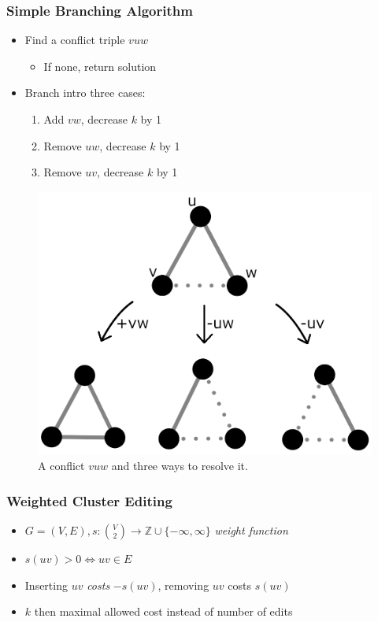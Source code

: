 \documentclass{beamer}
\begin{document}
\begin{frame}
	\frametitle{Simple Branching Algorithm}
	\begin{itemize}
		\item Find a conflict triple $vuw$
			\begin{itemize}
				\item If none, return solution
			\end{itemize}
		\item Branch intro three cases:
			\begin{enumerate}
				\item Add $vw$, decrease $k$ by 1
				\item Remove $uw$, decrease $k$ by 1
				\item Remove $uv$, decrease $k$ by 1
			\end{enumerate}
	\end{itemize}

	\begin{figure}[h]
		\centering
		\includegraphics[scale=0.5]{conflicts}
		\caption{A conflict $v u w$ and three ways to resolve it.}
	\end{figure}
\end{frame}

\begin{frame}
	\frametitle{Weighted Cluster Editing}
	\begin{itemize}
		\item $G = (V, E), s: \binom{V}{2} \to \mathbb{Z} \cup \{-\infty, \infty\}$ \emph{weight function}
		\item $s(uv) > 0 \Leftrightarrow uv \in E$
		\item Inserting $uv$ \emph{costs} $-s(uv)$, removing $uv$ costs $s(uv)$
		\item $k$ then maximal allowed cost instead of number of edits
	\end{itemize}
\end{frame}
\end{document}
